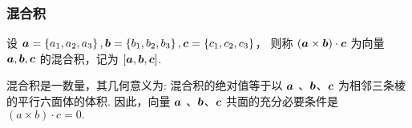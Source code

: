 % 
% 

\subsubsection{混合积}

\begin{definition}[向量的混合积]
    设 $ \vb*{a}=\left\{a_{1}, a_{2}, a_{3}\right\}, \vb*{b}=\left\{b_{1}, b_{2}, b_{3}\right\}, \vb*{c}=\left\{c_{1}, c_{2}, c_{3}\right\}$，
    则称 $ (\vb*{a} \times \vb*{b}) \cdot \vb*{c} $ 为向量 $ \vb*{a}, \vb*{b}, \vb*{c} $ 的混合积，记为 $ [\vb*{a}, \vb*{b}, \vb*{c}] $.
\end{definition}

\begin{theorem}[共面条件]
    混合积是一数量，其几何意义为: 混合积的绝对值等于以 $ \vb*{a}$ 、$ \vb*{b} $、$ \vb*{c} $ 为相邻三条棱的平行六面体的体积.
    因此，向量 $ \vb*{a}$ 、$ \vb*{b} $、$ \vb*{c} $ 共面的充分必要条件是 $ (a \times b) \cdot c=0 .$
\end{theorem}